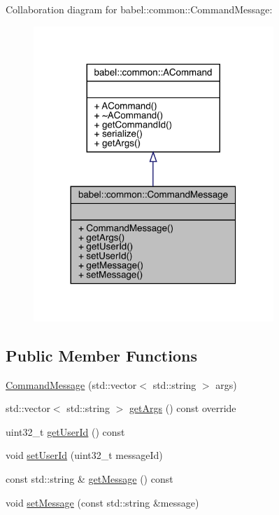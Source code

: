 Collaboration diagram for babel\+:\+:common\+:\+:Command\+Message\+:\nopagebreak
\begin{figure}[H]
\begin{center}
\leavevmode
\includegraphics[width=257pt]{classbabel_1_1common_1_1_command_message__coll__graph}
\end{center}
\end{figure}
\subsection*{Public Member Functions}
\begin{DoxyCompactItemize}
\item 
\mbox{\hyperlink{classbabel_1_1common_1_1_command_message_a3b8229f6b6b8bf9dbfed3278f888ffda}{Command\+Message}} (std\+::vector$<$ std\+::string $>$ args)
\item 
std\+::vector$<$ std\+::string $>$ \mbox{\hyperlink{classbabel_1_1common_1_1_command_message_a930b0c028e19e070a7c7b54d4322d64e}{get\+Args}} () const override
\item 
uint32\+\_\+t \mbox{\hyperlink{classbabel_1_1common_1_1_command_message_a8c19d711e81fe95c2d6c3e9b0f2ad6a8}{get\+User\+Id}} () const
\item 
void \mbox{\hyperlink{classbabel_1_1common_1_1_command_message_a9cdc433b630a17b5468ca341f5a2b932}{set\+User\+Id}} (uint32\+\_\+t message\+Id)
\item 
const std\+::string \& \mbox{\hyperlink{classbabel_1_1common_1_1_command_message_aca6a2c89bc1a1ddf50c3c27b33e94fc4}{get\+Message}} () const
\item 
void \mbox{\hyperlink{classbabel_1_1common_1_1_command_message_a63fdb3e61f8b8e9259aa0aa65dca2bad}{set\+Message}} (const std\+::string \&message)
\end{DoxyCompactItemize}


